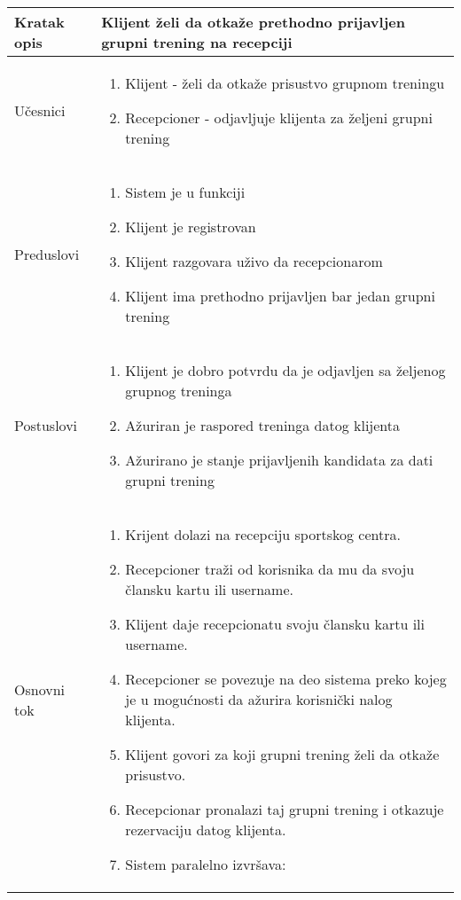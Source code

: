 \documentclass[../grupniTreninzi.tex]{subfiles}
\begin{document}
\begin{longtable}{| p{} | p{} |} 
\hline
    Kratak opis &  Klijent želi da otkaže prethodno prijavljen grupni trening na recepciji\\ 
\hline    
    Učesnici &
    \begin{enumerate}
        \item Klijent - želi da otkaže prisustvo grupnom treningu
        \item Recepcioner - odjavljuje klijenta za željeni grupni trening 
    \end{enumerate}\\
\hline
   Preduslovi & 
   \begin{enumerate}
        \item Sistem je u funkciji
        \item Klijent je registrovan
        \item Klijent razgovara uživo da recepcionarom
        \item Klijent ima prethodno prijavljen bar jedan grupni trening
    \end{enumerate}\\
\hline  
    Postuslovi &
    \begin{enumerate}
        \item Klijent je dobro potvrdu da je odjavljen sa željenog grupnog treninga
        \item Ažuriran je raspored treninga datog klijenta
        \item Ažurirano je stanje prijavljenih kandidata za dati grupni trening
    \end{enumerate}\\
\hline
    Osnovni tok & 
    \begin{enumerate}
        \item Krijent dolazi na recepciju sportskog centra.
        \item Recepcioner traži od korisnika da mu da svoju člansku kartu ili username.
        \item Klijent daje recepcionatu svoju člansku kartu ili username.
        \item Recepcioner se povezuje na deo sistema preko kojeg je u mogućnosti da ažurira korisnički nalog klijenta.
        \item Klijent govori za koji grupni trening želi da otkaže prisustvo.
        \item Recepcionar pronalazi taj grupni trening i otkazuje rezervaciju datog klijenta.
        \item Sistem paralelno izvršava:

\end{enumerate}
\end{longtable}
\end{document}
